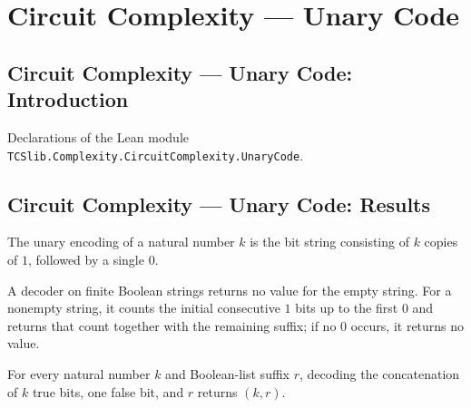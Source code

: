 \section{Circuit Complexity --- Unary Code}
\subsection*{Circuit Complexity --- Unary Code: Introduction}

Declarations of the Lean module \texttt{TCSlib.Complexity.CircuitComplexity.UnaryCode}.

\subsection*{Circuit Complexity --- Unary Code: Results}

\begin{definition}
\label{BoolCircuit.encodeNat}
\leanok
The unary encoding of a natural number $k$ is the bit string consisting of $k$ copies of
$1$, followed by a single $0$.
\end{definition}

\begin{definition}
\label{BoolCircuit.decodeNat}
\leanok
A decoder on finite Boolean strings returns no value for the empty string. For a
nonempty string, it counts the initial consecutive $1$ bits up to the first $0$ and
returns that count together with the remaining suffix; if no $0$ occurs, it returns no
value.
\end{definition}

\begin{theorem}
\label{BoolCircuit.decodeNat_encodeNat}
\leanok
{}
For every natural number $k$ and Boolean-list suffix $r$, decoding the concatenation of
$k$ true bits, one false bit, and $r$ returns $(k,r)$.
\end{theorem}
